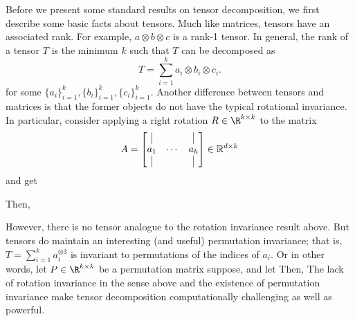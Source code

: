 Before we present some standard results on tensor decomposition, we first describe some basic facts about tensors. Much like matrices, tensors have an associated rank. For example, $a \otimes b \otimes c$ is a rank-1 tensor. In general, the rank of a tensor $T$ is the minimum $k$ such that $T$ can be decomposed as 
\begin{equation}
    T = \sum_{i=1}^k a_i \otimes b_i \otimes c_i.
\end{equation} 
for some $\{a_i\}_{i =1}^k, \{b_i\}_{i =1}^k, \{c_i\}_{i =1}^k$.
Another difference between tensors and matrices is that the former objects do not have the typical rotational invariance. In particular, consider applying a right rotation $R\in \R^{k\times k}$ to the matrix \begin{equation}
A =\begin{bmatrix} \vrule & & \vrule \\ a_1 & \cdots & a_k \\ \vrule & & \vrule \end{bmatrix} \in\mathbb{R}^{d\times k}
\end{equation}
and get 

Then, 

However, there is no tensor analogue to the rotation invariance result above. 
But tensors do maintain an interesting (and useful) permutation invariance; that is, $T = \sum_{i = 1}^k a_i^{\otimes 3}$ is invariant to permutations of the indices of $a_i$. Or in other words, let $P\in \R^{k\times k}$ be a permutation matrix suppose, and let 
Then, 
The lack of rotation invariance in the sense above and the existence of permutation invariance make tensor decomposition computationally challenging as well as powerful. 


